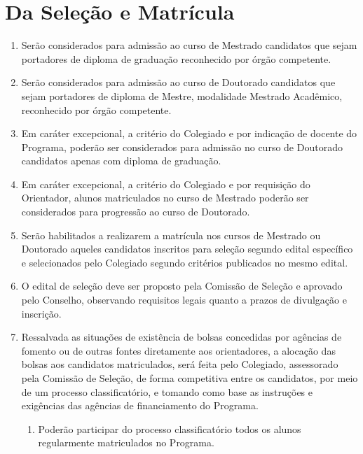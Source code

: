 \documentclass{article}
\newcommand{\grupoMenor}{Colegiado\xspace}
\newcommand{\grupoMaior}{Conselho\xspace}
\begin{document}
\section{Da Seleção e Matrícula}
\begin{enumerate}
	\item Serão considerados para admissão ao curso de Mestrado candidatos que sejam portadores de diploma de graduação reconhecido por órgão competente.

	\item Serão considerados para admissão ao curso de Doutorado candidatos que sejam portadores de diploma de Mestre, modalidade Mestrado Acadêmico, reconhecido por órgão competente.

	\item Em caráter excepcional, a critério do \grupoMenor e por indicação de docente do Programa, poderão ser considerados para admissão no curso de Doutorado candidatos apenas com diploma de graduação.

	\item Em caráter excepcional, a critério do \grupoMenor e por requisição do Orientador, alunos matriculados no curso de Mestrado poderão ser considerados para progressão ao curso de Doutorado.

	\item Serão habilitados a realizarem a matrícula nos cursos de Mestrado ou Doutorado aqueles candidatos inscritos para seleção segundo edital específico e selecionados pelo \grupoMenor segundo critérios publicados no mesmo edital.

	\item O edital de seleção deve ser proposto pela Comissão de Seleção e aprovado pelo \grupoMaior, observando requisitos legais quanto a prazos de divulgação e inscrição.

	\item Ressalvada as situações de existência de bolsas concedidas por agências de fomento ou de outras fontes diretamente aos orientadores, a alocação das bolsas aos candidatos matriculados, será feita pelo \grupoMenor, assessorado pela Comissão de Seleção, de forma competitiva entre os candidatos, por meio de um processo classificatório, e tomando como base as instruções e exigências das agências de financiamento do Programa.
	\begin{enumerate}
		\item Poderão participar do processo classificatório todos os alunos regularmente matriculados no Programa.
	\end{enumerate}
	

\end{enumerate}
\end{document}
